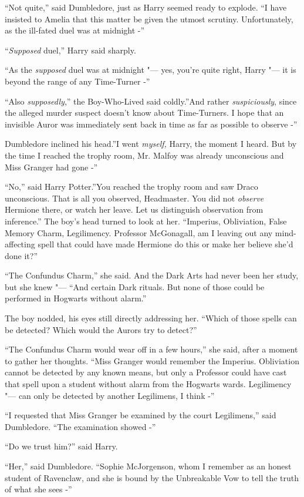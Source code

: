 ``Not quite,'' said Dumbledore, just as Harry seemed ready to explode.
``I have insisted to Amelia that this matter be given the utmost
scrutiny. Unfortunately, as the ill-fated duel was at midnight -''

``\emph{Supposed} duel,'' Harry said sharply.

``As the \emph{supposed} duel was at midnight "--- yes, you're quite right,
Harry "--- it is beyond the range of any Time-Turner -''

``Also \emph{supposedly},'' the Boy-Who-Lived said coldly.''And rather
\emph{suspiciously}, since the alleged murder suspect doesn't know about
Time-Turners. I hope that an invisible Auror was immediately sent back
in time as far as possible to observe -''

Dumbledore inclined his head.''I went \emph{myself,} Harry, the moment I
heard. But by the time I reached the trophy room, Mr. Malfoy was already
unconscious and Miss Granger had gone -''

``No,'' said Harry Potter.''You reached the trophy room and saw Draco
unconscious. That is all you observed, Headmaster. You did not
\emph{observe} Hermione there, or watch her leave. Let us distinguish
observation from inference.'' The boy's head turned to look at her.
``Imperius, Obliviation, False Memory Charm, Legilimency. Professor
McGonagall, am I leaving out any mind-affecting spell that could have
made Hermione do this or make her believe she'd done it?''

``The Confundus Charm,'' she said. And the Dark Arts had never been her
study, but she knew "--- ``And certain Dark rituals. But none of those
could be performed in Hogwarts without alarm.''

The boy nodded, his eyes still directly addressing her. ``Which of those
spells can be detected? Which would the Aurors try to detect?''

``The Confundus Charm would wear off in a few hours,'' she said, after a
moment to gather her thoughts. ``Miss Granger would remember the
Imperius. Obliviation cannot be detected by any known means, but only a
Professor could have cast that spell upon a student without alarm from
the Hogwarts wards. Legilimency "--- can only be detected by another
Legilimens, I think -''

``I requested that Miss Granger be examined by the court Legilimens,''
said Dumbledore. ``The examination showed -''

``Do we trust him?'' said Harry.

``Her,'' said Dumbledore. ``Sophie McJorgenson, whom I remember as an
honest student of Ravenclaw, and she is bound by the Unbreakable Vow to
tell the truth of what she sees -''

